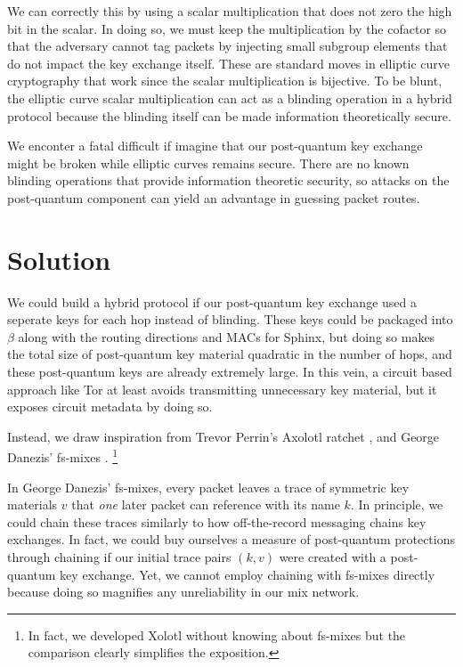 \documentclass[twoside,letterpaper]{llncs}
\begin{document}
We can correctly this by using a scalar multiplication that does not
zero the high bit in the scalar.  In doing so, we must keep the
multiplication by the cofactor so that the adversary cannot tag
packets by injecting small subgroup elements that do not impact the
key exchange itself.  These are standard moves in elliptic curve 
cryptography that work since the scalar multiplication is bijective.
To be blunt, the elliptic curve scalar multiplication can act as
a blinding operation in a hybrid protocol because the blinding itself
can be made information theoretically secure.

We enconter a fatal difficult if imagine that our post-quantum key 
exchange might be broken while elliptic curves remains secure.  
There are no known blinding operations that provide information
theoretic security, so attacks on the post-quantum component can
yield an advantage in guessing packet routes.


\section{Solution}

We could build a hybrid protocol if our post-quantum key exchange
used a seperate keys for each hop instead of blinding.  These keys
could be packaged into $\beta$ along with the routing directions and
MACs for Sphinx, but doing so makes the total size of post-quantum 
key material quadratic in the number of hops, and these post-quantum
keys are already extremely large.
In this vein, a circuit based approach like Tor at least avoids
transmitting unnecessary key material, but it exposes circuit
metadata by doing so. 

Instead, we draw inspiration from Trevor Perrin's Axolotl ratchet
\cite{TextSecure}, and George Danezis' fs-mixes \cite{fs-mix}.
\footnote{In fact, we developed Xolotl without knowing about fs-mixes
but the comparison clearly simplifies the exposition.}


In George Danezis' fs-mixes, every packet leaves a trace of symmetric
key materials $v$ that {\it one} later packet can reference with its
name $k$.  In principle, we could chain these traces similarly to
how off-the-record messaging \cite{OtR} chains key exchanges.
In fact, we could buy ourselves a measure of post-quantum protections
through chaining if our initial trace pairs $(k,v)$ were created with
a post-quantum key exchange.  Yet, we cannot employ chaining with
fs-mixes directly because doing so magnifies any unreliability in
our mix network. 
\end{document}
